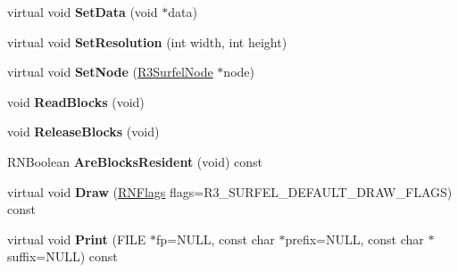 \begin{DoxyCompactItemize}
\item 
virtual void {\bfseries Set\+Data} (void $\ast$data)\hypertarget{class_r3_surfel_scan_af3bbf1d1a584acf9043e885e7c2d92f4}{}\label{class_r3_surfel_scan_af3bbf1d1a584acf9043e885e7c2d92f4}

\item 
virtual void {\bfseries Set\+Resolution} (int width, int height)\hypertarget{class_r3_surfel_scan_a4847caa724ecd12dcbd37909552a40bb}{}\label{class_r3_surfel_scan_a4847caa724ecd12dcbd37909552a40bb}

\item 
virtual void {\bfseries Set\+Node} (\hyperlink{class_r3_surfel_node}{R3\+Surfel\+Node} $\ast$node)\hypertarget{class_r3_surfel_scan_a7750612aeb9adc276893113ae3f18c52}{}\label{class_r3_surfel_scan_a7750612aeb9adc276893113ae3f18c52}

\item 
void {\bfseries Read\+Blocks} (void)\hypertarget{class_r3_surfel_scan_a3bed3552a4e40ed660c3c1250cecbe21}{}\label{class_r3_surfel_scan_a3bed3552a4e40ed660c3c1250cecbe21}

\item 
void {\bfseries Release\+Blocks} (void)\hypertarget{class_r3_surfel_scan_a39d6498c4eefe56cc69909f6185af692}{}\label{class_r3_surfel_scan_a39d6498c4eefe56cc69909f6185af692}

\item 
R\+N\+Boolean {\bfseries Are\+Blocks\+Resident} (void) const \hypertarget{class_r3_surfel_scan_a1200bc3c902ff266860781c8c316be69}{}\label{class_r3_surfel_scan_a1200bc3c902ff266860781c8c316be69}

\item 
virtual void {\bfseries Draw} (\hyperlink{class_r_n_flags}{R\+N\+Flags} flags=R3\+\_\+\+S\+U\+R\+F\+E\+L\+\_\+\+D\+E\+F\+A\+U\+L\+T\+\_\+\+D\+R\+A\+W\+\_\+\+F\+L\+A\+GS) const \hypertarget{class_r3_surfel_scan_a3967df9732b70165ec7936c62369353b}{}\label{class_r3_surfel_scan_a3967df9732b70165ec7936c62369353b}

\item 
virtual void {\bfseries Print} (F\+I\+LE $\ast$fp=N\+U\+LL, const char $\ast$prefix=N\+U\+LL, const char $\ast$suffix=N\+U\+LL) const \hypertarget{class_r3_surfel_scan_ac0dae36e5d8ce1bc7d174f878e0bf712}{}\label{class_r3_surfel_scan_ac0dae36e5d8ce1bc7d174f878e0bf712}

\end{DoxyCompactItemize}
